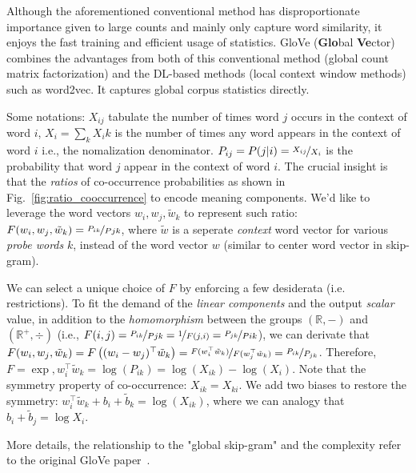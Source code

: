
Although the aforementioned conventional method has disproportionate importance given to large counts and mainly only capture word similarity, it enjoys the fast training and efficient usage of statistics.
GloVe (\textbf{Glo}bal \textbf{Ve}ctor)  combines the advantages from both of this conventional method (global count matrix factorization) and the DL-based methods (local context window methods) such as word2vec.
It captures global corpus statistics directly.


Some notations: $X_{ij}$ tabulate the number of times word $j$ occurs in the context of word $i$, $X_i = \sum_{k} X_ik$ is the number of times any word appears in the context of word $i$ i.e., the nomalization denominator.
$P_{ij} = P(j|i) = \nicefrac{X_{ij}}{X_i}$ is the probability that word $j$ appear in the context of word $i$.
The crucial insight is that the \emph{ratios} of co-occurrence probabilities as shown in Fig.~\ref{fig:ratio_cooccurrence} to encode meaning components.
We'd like to leverage the word vectors $w_i, w_j, \tilde{w}_k$ to represent such ratio: $F(w_i, w_j, \tilde{w}_k) = \nicefrac{P_{ik}}{P{jk}}$, where $\tilde{w}$ is a seperate \emph{context} word vector for various \emph{probe words} $k$, instead of the word vector $w$ (similar to center word vector in skip-gram).

We can select a unique choice of $F$ by enforcing a few desiderata (i.e. restrictions).
To fit the demand of the \emph{linear components} and the output \emph{scalar} value, in addition to the \emph{homomorphism}
between the groups $(\mathbb{R}, -)$ and $(\mathbb{R}^+, \div)$ (i.e., $F(i,j) = \nicefrac{P_{ik}}{P{jk}} = \nicefrac{1}{F(j,i)} = \nicefrac{P_{jk}}{P{ik}}$), we can derivate that $F(w_i, w_j, \tilde{w}_k) = F\left((w_i - w_j)^\top \tilde{w}_k\right) = \nicefrac{F(w_i^\top \tilde{w}_k)}{F(w_j^\top \tilde{w}_k)} = \nicefrac{P_{ik}}{P_{jk}}$.
Therefore, $F=\exp, w_i^\top \tilde{w}_k = \log(P_{ik}) = \log (X_{ik}) - \log (X_i)$.
Note that the symmetry property of co-occurrence: $X_{ik} = X_{ki}$.
We add two biases to restore the symmetry: $w_i^\top \tilde{w}_k + b_i + \tilde{b}_k = \log (X_{ik})$, where we can analogy that $b_i + \tilde{b}_j = \log X_{i}$.

More details, the relationship to the "global skip-gram" and the complexity refer to the original GloVe paper~.

